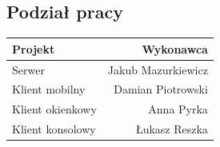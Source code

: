 \documentclass[8pt,a4paper]{article}
\begin{document}
\subsection{Podział pracy}

\begin{center}
    \begin{tabular}{l|r}
        \textbf{Projekt} & \textbf{Wykonawca} \\
        \hline
        Serwer & Jakub Mazurkiewicz \\
        Klient mobilny & Damian Piotrowski \\
        Klient okienkowy & Anna Pyrka \\
        Klient konsolowy & Łukasz Reszka
    \end{tabular}
\end{center}
\end{document}
